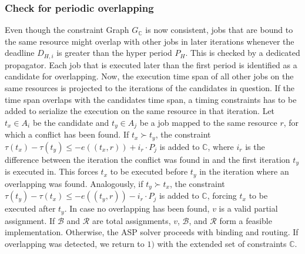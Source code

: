 \subsubsection{Check for periodic overlapping}
Even though the constraint Graph $G_\mathbb{C}$ is now consistent, jobs that are bound to the same resource might overlap with other jobs in later iterations whenever the deadline $D_{H,i}$ is greater than the hyper period $P_H$. This is checked by a dedicated propagator.
Each job that is executed later than the first period is identified as a candidate for overlapping.
Now, the execution time span of all other jobs on the same resources is projected to the iterations of the candidates in question.
If the time span overlaps with the candidates time span, 
a timing constraints has to be added to serialize the execution on the same resource in that iteration.
Let $t_x \in A_i$ be the candidate and $t_y\in A_j$ be a job mapped to the same resource $r$, for which a conflict has been found.
If $t_x\succ t_y$, the constraint $\tau(t_x)-\tau(t_y)\leq -e((t_x,r))+i_r\cdot P_j$ is added to $\mathbb{C}$,
where $i_r$ is the difference between the iteration the conflict was found in and the first iteration $t_y$ is executed in.
This forces $t_x$ to be executed before $t_y$ in the iteration where an overlapping was found.
Analogously, if $t_y\succ t_x$, the constraint $\tau(t_y)-\tau(t_x)\leq -e((t_y,r))-i_r\cdot P_j$ is added to $\mathbb{C}$, forcing $t_x$ to be executed after $t_y$.
In case no overlapping has been found, $v$ is a valid partial assignment. 
If $\mathcal{B}$ and $\mathcal{R}$ are total assignments, $v$, $\mathcal{B}$, and $\mathcal{R}$ form a feasible implementation.
Otherwise, the ASP solver proceeds with binding and routing.
If overlapping was detected, we return to $1)$ with the extended set of constraints $\mathbb{C}$.


